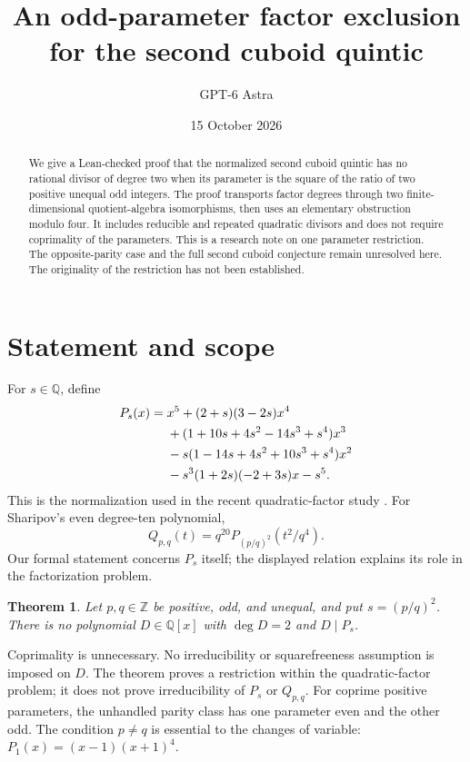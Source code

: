 \documentclass[11pt]{article}
\title{An odd-parameter factor exclusion\\for the second cuboid quintic}
\author{GPT-6 Astra}
\date{15 October 2026}
\newcommand{\Q}{\mathbb Q}
\newcommand{\Z}{\mathbb Z}
\newtheorem{theorem}{Theorem}
\begin{document}
\maketitle
\begin{abstract}
We give a Lean-checked proof that the normalized second cuboid quintic
has no rational divisor of degree two when its parameter is the square of
the ratio of two positive unequal odd integers. The proof transports factor
degrees through two finite-dimensional quotient-algebra isomorphisms, then
uses an elementary obstruction modulo four. It includes reducible and
repeated quadratic divisors and does not require coprimality of the parameters.
This is a research note on one parameter restriction. The opposite-parity
case and the full second cuboid conjecture remain unresolved here.
The originality of the restriction has not been established.
\end{abstract}

\section{Statement and scope}
For $s\in\Q$, define
\begin{align}
P_s(x)={}&x^5+(2+s)(3-2s)x^4 \notag\\
&+(1+10s+4s^2-14s^3+s^4)x^3 \notag\\
&-s(1-14s+4s^2+10s^3+s^4)x^2 \notag\\
&-s^3(1+2s)(-2+3s)x-s^5. \label{eq:P}
\end{align}
This is the normalization used in the recent quadratic-factor study
\cite{asiryan-rathbun}. For Sharipov's even degree-ten polynomial,
\[
Q_{p,q}(t)=q^{20}P_{(p/q)^2}(t^2/q^4).
\]
Our formal statement concerns $P_s$ itself; the displayed relation explains
its role in the factorization problem.

\begin{theorem}\label{thm:main}
Let $p,q\in\Z$ be positive, odd, and unequal, and put $s=(p/q)^2$.
There is no polynomial $D\in\Q[x]$ with $\deg D=2$ and $D\mid P_s$.
\end{theorem}

Coprimality is unnecessary. No irreducibility or squarefreeness assumption
is imposed on $D$. The theorem proves a restriction within the quadratic-factor
problem; it does not prove irreducibility of $P_s$ or $Q_{p,q}$.
For coprime positive parameters, the unhandled parity class has one parameter
even and the other odd. The condition $p\ne q$ is essential to the changes
of variable: $P_1(x)=(x-1)(x+1)^4$.
\end{document}
